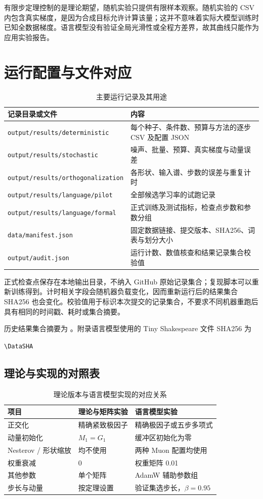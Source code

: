 有限步定理控制的是理论期望，随机实验只提供有限样本观察。随机实验的 CSV 内包含真实梯度，是因为合成目标允许计算该量；这并不意味着实际大模型训练时已知全数据梯度。语言模型没有验证全局光滑性或全程方差界，故其曲线只能作为应用实验报告。

\section{运行配置与文件对应}
\begin{table}[htbp]\centering\small
\caption{主要运行记录及其用途}
\begin{tabularx}{\linewidth}{lX}\toprule
记录目录或文件 & 内容 \\\midrule
\texttt{output/results/deterministic} & 每个种子、条件数、预算与方法的逐步 CSV 及配置 JSON \\
\texttt{output/results/stochastic} & 噪声、批量、预算、真实梯度与动量误差 \\
\texttt{output/results/orthogonalization} & 各形状、输入谱、步数的误差与重复计时 \\
\texttt{output/results/language/pilot} & 全部候选学习率的试跑记录 \\
\texttt{output/results/language/formal} & 正式训练及测试指标，检查点步数和参数分组 \\
\texttt{data/manifest.json} & 固定数据链接、提交版本、SHA256、词表与划分大小 \\
\texttt{output/audit.json} & 运行计数、数值核查和结果记录集合校验值 \\
\bottomrule\end{tabularx}
\end{table}
正式检查点保存在本地输出目录，不纳入 GitHub 原始记录集合；复现脚本可以重新训练得到。计时相关字段会随机器负载变化，因而重新运行后的结果集合 SHA256 也会变化。校验值用于标识本次提交的记录集合，不要求不同机器重跑后具有相同的时间戳、耗时或集合摘要。

历史结果集合摘要为 \texttt{\ResultDigest}。附录语言模型使用的 Tiny Shakespeare 文件 SHA256 为
\begin{center}\footnotesize\ttfamily\expandafter\nolinkurl\expandafter{\DataSHA}\end{center}

\subsection{理论与实现的对照表}
\begin{table}[htbp]
\centering\small
\caption{理论版本与语言模型实现的对应关系}
\begin{tabularx}{\linewidth}{lXX}
\toprule 项目 & 理论与矩阵实验 & 语言模型实验 \\\midrule
正交化 & 精确紧致极因子 & 精确极因子或五步多项式 \\
动量初始化 & $M_1=G_1$ & 缓冲区初始化为零 \\
Nesterov / 形状缩放 & 均不使用 & 两种 Muon 配置均使用 \\
权重衰减 & 0 & 权重矩阵 0.01 \\
其他参数 & 单个矩阵 & AdamW 辅助参数组 \\
步长与动量 & 按定理设置 & 验证集选步长，$\beta=0.95$ \\
\bottomrule
\end{tabularx}
\end{table}
